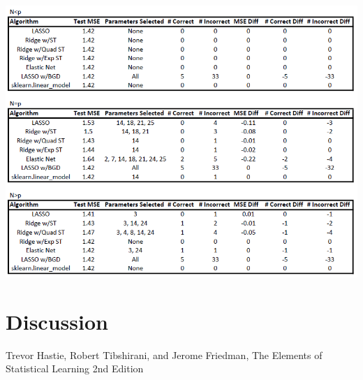 \documentclass[11pt]{article}
\begin{document}
\begin{center}
\includegraphics[scale=0.7]{corr.PNG}
\end{center}

\section{Discussion}


\begin{thebibliography}{9}
Trevor Hastie, Robert Tibshirani, and Jerome Friedman,
The Elements of Statistical Learning 2nd Edition
\end{thebibliography}
\end{document}
